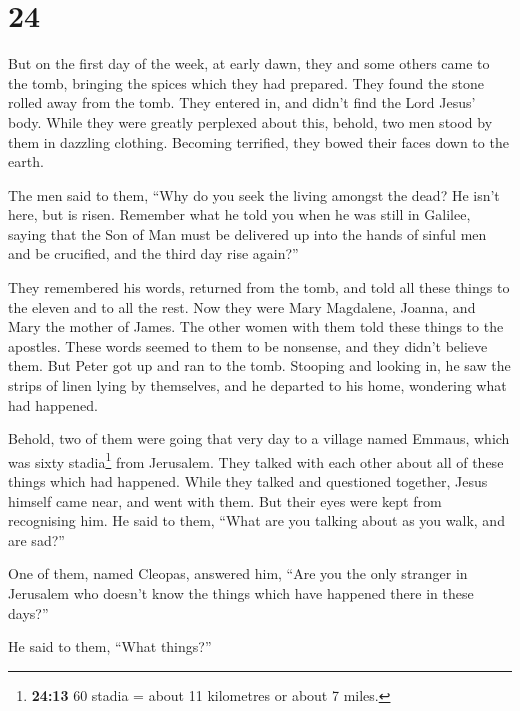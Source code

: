 \hypertarget{section-14}{%
\section{24}\label{section-14}}

 But on the first day of the week, at early dawn, they and
some others came to the tomb, bringing the spices which they had
prepared.  They found the stone rolled away from the tomb.
 They entered in, and didn't find the Lord Jesus' body.
 While they were greatly perplexed about this, behold, two
men stood by them in dazzling clothing.  Becoming
terrified, they bowed their faces down to the earth.

The men said to them, ``Why do you seek the living amongst the dead?
 He isn't here, but is risen. Remember what he told you
when he was still in Galilee,  saying that the Son of Man
must be delivered up into the hands of sinful men and be crucified, and
the third day rise again?''

 They remembered his words,  returned from
the tomb, and told all these things to the eleven and to all the rest.
 Now they were Mary Magdalene, Joanna, and Mary the
mother of James. The other women with them told these things to the
apostles.  These words seemed to them to be nonsense, and
they didn't believe them.  But Peter got up and ran to
the tomb. Stooping and looking in, he saw the strips of linen lying by
themselves, and he departed to his home, wondering what had happened.

 Behold, two of them were going that very day to a
village named Emmaus, which was sixty stadia\footnote{\textbf{24:13} 60
  stadia = about 11 kilometres or about 7 miles.} from Jerusalem.
 They talked with each other about all of these things
which had happened.  While they talked and questioned
together, Jesus himself came near, and went with them. 
But their eyes were kept from recognising him.  He said
to them, ``What are you talking about as you walk, and are sad?''

 One of them, named Cleopas, answered him, ``Are you the
only stranger in Jerusalem who doesn't know the things which have
happened there in these days?''

 He said to them, ``What things?''

